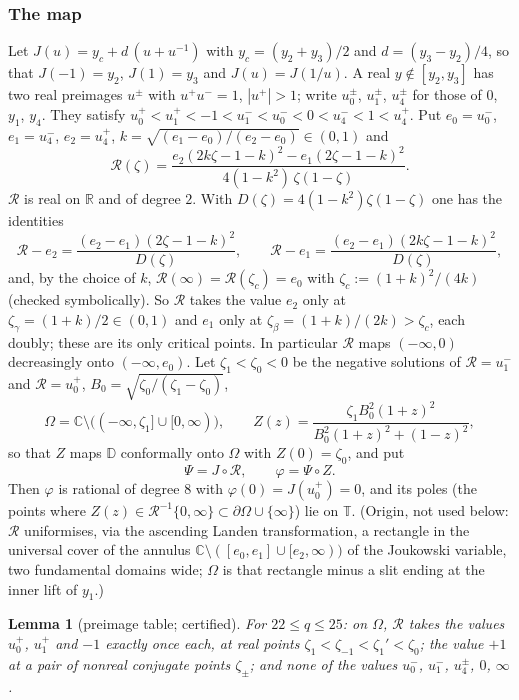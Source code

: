 \documentclass[11pt]{amsart}
\newtheorem{lemma}[proposition]{Lemma}
\theoremstyle{definition}
\theoremstyle{remark}
\numberwithin{equation}{section}
\newcommand{\RR}{\mathbb{R}}
\newcommand{\CC}{\mathbb{C}}
\newcommand{\DD}{\mathbb{D}}
\newcommand{\TT}{\mathbb{T}}
\begin{document}
\subsubsection*{The map}
Let $J(u)=y_c+d\,(u+u^{-1})$ with $y_c=(y_2+y_3)/2$ and $d=(y_3-y_2)/4$, so that $J(-1)=y_2$, $J(1)=y_3$ and
$J(u)=J(1/u)$. A real $y\notin[y_2,y_3]$ has two real preimages $u^{\pm}$ with $u^+u^-=1$, $|u^+|>1$; write $u_0^\pm$,
$u_1^\pm$, $u_4^\pm$ for those of $0$, $y_1$, $y_4$. They satisfy
$u_0^+<u_1^+<-1<u_1^-<u_0^-<0<u_4^-<1<u_4^+$. Put $e_0=u_0^-$, $e_1=u_4^-$, $e_2=u_4^+$, $k=\sqrt{(e_1-e_0)/(e_2-e_0)}
\in(0,1)$ and
\[
\mathcal R(\zeta)=\frac{e_2(2k\zeta-1-k)^2-e_1(2\zeta-1-k)^2}{4(1-k^2)\,\zeta(1-\zeta)} .
\]
$\mathcal R$ is real on $\RR$ and of degree $2$. With $D(\zeta)=4(1-k^2)\zeta(1-\zeta)$ one has the identities
\[
\mathcal R-e_2=\frac{(e_2-e_1)(2\zeta-1-k)^2}{D(\zeta)},\qquad\mathcal R-e_1=\frac{(e_2-e_1)(2k\zeta-1-k)^2}{D(\zeta)},
\]
and, by the choice of $k$, $\mathcal R(\infty)=\mathcal R(\zeta_c)=e_0$ with $\zeta_c:=(1+k)^2/(4k)$ (checked symbolically).
So $\mathcal R$ takes the value $e_2$ only at $\zeta_\gamma=(1+k)/2\in(0,1)$ and $e_1$ only at
$\zeta_\beta=(1+k)/(2k)>\zeta_c$, each doubly; these are its only critical points. In particular $\mathcal R$ maps
$(-\infty,0)$ decreasingly onto $(-\infty,e_0)$. Let
$\zeta_1<\zeta_0<0$ be the negative solutions of $\mathcal R=u_1^-$ and $\mathcal R=u_0^+$, $B_0=\sqrt{\zeta_0/(\zeta_1-\zeta_0)}$,
\[
\Omega=\CC\setminus\bigl((-\infty,\zeta_1]\cup[0,\infty)\bigr),\qquad
Z(z)=\frac{\zeta_1B_0^2(1+z)^2}{B_0^2(1+z)^2+(1-z)^2},
\]
so that $Z$ maps $\DD$ conformally onto $\Omega$ with $Z(0)=\zeta_0$, and put
\[
\Psi=J\circ\mathcal R,\qquad\varphi=\Psi\circ Z .
\]
Then $\varphi$ is rational of degree $8$ with $\varphi(0)=J(u_0^+)=0$, and its poles (the points where $Z(z)\in
\mathcal R^{-1}\{0,\infty\}\subset\partial\Omega\cup\{\infty\}$) lie on $\TT$. (Origin, not used below: $\mathcal R$
uniformises, via the ascending Landen transformation, a rectangle in the universal cover of the annulus
$\CC\setminus([e_0,e_1]\cup[e_2,\infty))$ of the Joukowski variable, two fundamental domains wide; $\Omega$ is that
rectangle minus a slit ending at the inner lift of $y_1$.)

\begin{lemma}[preimage table; certified]\label{lem:Ktable}
For $22\le q\le25$: on $\Omega$, $\mathcal R$ takes the values $u_0^+$, $u_1^+$ and $-1$ exactly once each, at real points
$\zeta_1<\zeta_{-1}<\zeta_1'<\zeta_0$; the value $+1$ at a pair of nonreal conjugate points $\zeta_\pm$; and none of the
values $u_0^-$, $u_1^-$, $u_4^\pm$, $0$, $\infty$.
\end{lemma}
\end{document}

